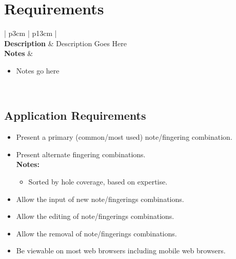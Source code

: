 \documentclass[12pt]{article}
\begin{document}

	\tableofcontents
	\newpage

	\section{Requirements}

			\begin{tabular}{ | p{3cm} | p{13cm} |}
				\hline
				 \\
				\hline
				\textbf{Description} & Description Goes Here \\ \hline
				\textbf{Notes} & 
					\begin{itemize}
						\item Notes go here
					\end{itemize} \\
				\hline
			\end{tabular}

		\subsection{Application Requirements}
			\begin{itemize}
				\item Present a primary (common/most used) note/fingering combination.
				\item Present alternate fingering combinations. \\
					\textbf{Notes:}
					\begin{itemize}
						\item Sorted by hole coverage, based on expertise.
					\end{itemize}
				\item Allow the input of new note/fingerings combinations.
				\item Allow the editing of note/fingerings combinations.
				\item Allow the removal of note/fingerings combinations.
				\item Be viewable on most web browsers including mobile web browsers.
			\end{itemize}
\end{document}
